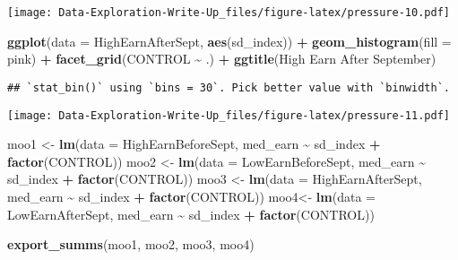 \documentclass[
]{article}
\newenvironment{Shaded}{\begin{snugshade}}{\end{snugshade}}
\newcommand{\DataTypeTok}[1]{\textcolor[rgb]{0.13,0.29,0.53}{#1}}
\newcommand{\KeywordTok}[1]{\textcolor[rgb]{0.13,0.29,0.53}{\textbf{#1}}}
\newcommand{\NormalTok}[1]{#1}
\newcommand{\OperatorTok}[1]{\textcolor[rgb]{0.81,0.36,0.00}{\textbf{#1}}}
\newcommand{\StringTok}[1]{\textcolor[rgb]{0.31,0.60,0.02}{#1}}
\begin{document}
\texttt{[image: Data-Exploration-Write-Up\_files/figure-latex/pressure-10.pdf]}

\begin{Shaded}
\begin{Highlighting}[]
\KeywordTok{ggplot}\NormalTok{(}\DataTypeTok{data =}\NormalTok{ HighEarnAfterSept, }\KeywordTok{aes}\NormalTok{(sd\_index)) }\OperatorTok{+}
\StringTok{  }\KeywordTok{geom\_histogram}\NormalTok{(}\DataTypeTok{fill =} \StringTok{\textquotesingle{}pink\textquotesingle{}}\NormalTok{) }\OperatorTok{+}
\StringTok{  }\KeywordTok{facet\_grid}\NormalTok{(CONTROL }\OperatorTok{\textasciitilde{}}\StringTok{ }\NormalTok{.) }\OperatorTok{+}\StringTok{ }\KeywordTok{ggtitle}\NormalTok{(}\StringTok{\textquotesingle{}High Earn After September\textquotesingle{}}\NormalTok{)}
\end{Highlighting}
\end{Shaded}

\begin{verbatim}
## `stat_bin()` using `bins = 30`. Pick better value with `binwidth`.
\end{verbatim}

\texttt{[image: Data-Exploration-Write-Up\_files/figure-latex/pressure-11.pdf]}

\begin{Shaded}
\begin{Highlighting}[]
\NormalTok{moo1 \textless{}{-}}\StringTok{ }\KeywordTok{lm}\NormalTok{(}\DataTypeTok{data =}\NormalTok{ HighEarnBeforeSept, med\_earn }\OperatorTok{\textasciitilde{}}\StringTok{ }\NormalTok{sd\_index }\OperatorTok{+}\StringTok{ }\KeywordTok{factor}\NormalTok{(CONTROL))}
\NormalTok{moo2 \textless{}{-}}\StringTok{ }\KeywordTok{lm}\NormalTok{(}\DataTypeTok{data =}\NormalTok{ LowEarnBeforeSept, med\_earn }\OperatorTok{\textasciitilde{}}\StringTok{ }\NormalTok{sd\_index }\OperatorTok{+}\StringTok{ }\KeywordTok{factor}\NormalTok{(CONTROL))}
\NormalTok{moo3 \textless{}{-}}\StringTok{ }\KeywordTok{lm}\NormalTok{(}\DataTypeTok{data =}\NormalTok{ HighEarnAfterSept, med\_earn }\OperatorTok{\textasciitilde{}}\StringTok{ }\NormalTok{sd\_index }\OperatorTok{+}\StringTok{ }\KeywordTok{factor}\NormalTok{(CONTROL))}
\NormalTok{moo4\textless{}{-}}\StringTok{ }\KeywordTok{lm}\NormalTok{(}\DataTypeTok{data =}\NormalTok{ LowEarnAfterSept, med\_earn }\OperatorTok{\textasciitilde{}}\StringTok{ }\NormalTok{sd\_index }\OperatorTok{+}\StringTok{ }\KeywordTok{factor}\NormalTok{(CONTROL))}

\KeywordTok{export\_summs}\NormalTok{(moo1, moo2, moo3, moo4)}
\end{Highlighting}
\end{Shaded}
\end{document}
